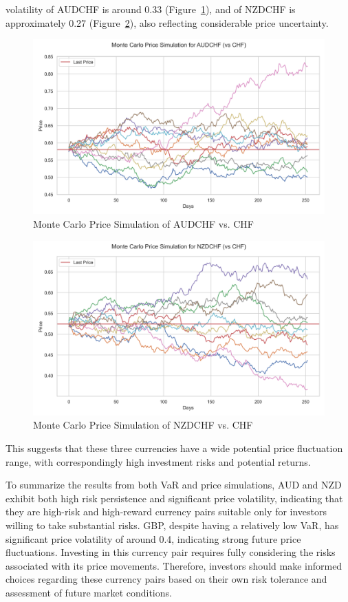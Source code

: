 \documentclass{article}
\begin{document}
volatility of AUDCHF is around 0.33 (Figure~\ref{fig:monte_carlo_price_simulation_AUDCHF_vs_CHF}), and of NZDCHF is approximately 0.27 (Figure~\ref{fig:monte_carlo_price_simulation_NZDCHF_vs_CHF}), also reflecting considerable price uncertainty. 

\begin{figure}[h]
    \centering
    \includegraphics[width=0.75\linewidth]{reports/figures/monte_carlo_price_simulation_AUDCHF_vs_CHF.png}
    \caption{Monte Carlo Price Simulation of AUDCHF vs. CHF} \label{fig:monte_carlo_price_simulation_AUDCHF_vs_CHF}
\end{figure}

\begin{figure}[h]
    \centering
    \includegraphics[width=0.75\linewidth]{reports/figures/monte_carlo_price_simulation_NZDCHF_vs_CHF.png}
    \caption{Monte Carlo Price Simulation of NZDCHF vs. CHF} \label{fig:monte_carlo_price_simulation_NZDCHF_vs_CHF}
\end{figure}
This suggests that these three currencies have a wide potential price fluctuation range, with correspondingly high investment risks and potential returns.

To summarize the results from both VaR and price simulations, AUD and NZD exhibit both high risk persistence and significant price volatility, indicating that they are high-risk and high-reward currency pairs suitable only for investors willing to take substantial risks. GBP, despite having a relatively low VaR, has significant price volatility of around 0.4, indicating strong future price fluctuations. Investing in this currency pair requires fully considering the risks associated with its price movements. Therefore, investors should make informed choices regarding these currency pairs based on their own risk tolerance and assessment of future market conditions.
\end{document}
